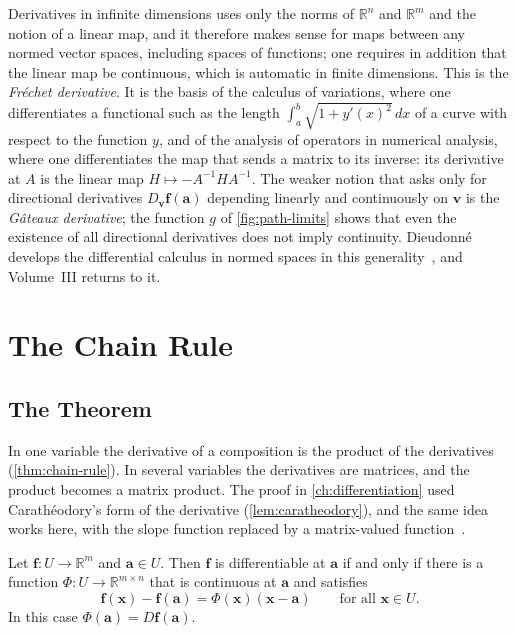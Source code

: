 \begin{note}{Derivatives in infinite dimensions}
 uses only the norms of $\mathbb R^n$ and $\mathbb R^m$ and the notion of a linear map, and it therefore makes sense for maps between any normed vector spaces, including spaces of functions; one requires in addition that the linear map be continuous, which is automatic in finite dimensions. This is the \emph{Fr\'echet derivative}. It is the basis of the calculus of variations, where one differentiates a functional such as the length $\int_a^b\sqrt{1+y'(x)^2}\,dx$ of a curve with respect to the function $y$, and of the analysis of operators in numerical analysis, where one differentiates the map that sends a matrix to its inverse: its derivative at $A$ is the linear map $H\mapsto-A^{-1}HA^{-1}$. The weaker notion that asks only for directional derivatives $D_{\mathbf v}\mathbf f(\mathbf a)$ depending linearly and continuously on $\mathbf v$ is the \emph{G\^ateaux derivative}; the function $g$ of \cref{fig:path-limits} shows that even the existence of all directional derivatives does not imply continuity. Dieudonn\'e develops the differential calculus in normed spaces in this generality~\cite{dieudonne1960}, and Volume~III returns to it.
\end{note}

\section{The Chain Rule}
\label{sec:chain-rule-n}

\subsection{The Theorem}

In one variable the derivative of a composition is the product of the derivatives (\cref{thm:chain-rule}). In several variables the derivatives are matrices, and the product becomes a matrix product. The proof in \cref{ch:differentiation} used Carath\'eodory's form of the derivative (\cref{lem:caratheodory}), and the same idea works here, with the slope function replaced by a matrix-valued function~\cite{acosta1994}.

\begin{lemma}
\label{lem:caratheodory-rn}
Let $\mathbf f\colon U\to\mathbb R^m$ and $\mathbf a\in U$. Then $\mathbf f$ is differentiable at $\mathbf a$ if and only if there is a function $\Phi\colon U\to\mathbb R^{m\times n}$ that is continuous at $\mathbf a$ and satisfies
\[
\mathbf f(\mathbf x)-\mathbf f(\mathbf a)=\Phi(\mathbf x)(\mathbf x-\mathbf a)\qquad\text{for all }\mathbf x\in U .
\]
In this case $\Phi(\mathbf a)=D\mathbf f(\mathbf a)$.
\end{lemma}

